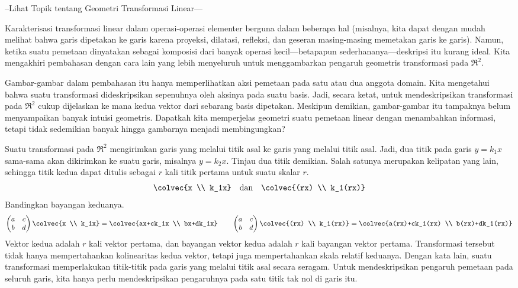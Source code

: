--Lihat Topik tentang Geometri Transformasi Linear---

Karakterisasi transformasi linear dalam operasi-operasi elementer berguna dalam
beberapa hal (misalnya, kita dapat dengan mudah melihat bahwa garis dipetakan ke
garis karena proyeksi, dilatasi, refleksi, dan geseran masing-masing memetakan
garis ke garis). Namun, ketika suatu pemetaan dinyatakan sebagai komposisi dari
banyak operasi kecil---betapapun sederhananya---deskripsi itu kurang ideal.
Kita mengakhiri pembahasan dengan cara lain yang lebih menyeluruh untuk
menggambarkan pengaruh geometris transformasi pada $\Re^2$.

Gambar-gambar dalam pembahasan itu hanya memperlihatkan aksi pemetaan pada satu
atau dua anggota domain. Kita mengetahui bahwa suatu transformasi dideskripsikan
sepenuhnya oleh aksinya pada suatu basis. Jadi, secara ketat, untuk
mendeskripsikan transformasi pada $\Re^2$ cukup dijelaskan ke mana kedua vektor
dari sebarang basis dipetakan. Meskipun demikian, gambar-gambar itu tampaknya
belum menyampaikan banyak intuisi geometris. Dapatkah kita memperjelas geometri
suatu pemetaan linear dengan menambahkan informasi, tetapi tidak sedemikian
banyak hingga gambarnya menjadi membingungkan?

Suatu transformasi pada $\Re^2$ mengirimkan garis yang melalui titik asal ke
garis yang melalui titik asal. Jadi, dua titik pada garis $y=k_1x$ sama-sama
akan dikirimkan ke suatu garis, misalnya $y=k_2x$. Tinjau dua titik demikian.
Salah satunya merupakan kelipatan yang lain, sehingga titik kedua dapat ditulis
sebagai $r$ kali titik pertama untuk suatu skalar $r$.
\begin{equation*}
  \colvec{x \\ k_1x}\quad\mbox{dan}\quad\colvec{(rx) \\ k_1(rx)}
\end{equation*}
Bandingkan bayangan keduanya.
\begin{equation*}
  \begin{pmatrix}
    a  &c  \\
    b  &d
  \end{pmatrix}
  \colvec{x \\ k_1x}
  =
  \colvec{ax+ck_1x \\ bx+dk_1x}
  \qquad
  \begin{pmatrix}
    a  &c  \\
    b  &d
  \end{pmatrix}
  \colvec{(rx) \\ k_1(rx)}
  =
  \colvec{a(rx)+ck_1(rx) \\ b(rx)+dk_1(rx)}
\end{equation*}
Vektor kedua adalah $r$ kali vektor pertama, dan bayangan vektor kedua adalah
$r$ kali bayangan vektor pertama. Transformasi tersebut tidak hanya
mempertahankan kolinearitas kedua vektor, tetapi juga mempertahankan skala
relatif keduanya. Dengan kata lain, suatu transformasi memperlakukan titik-titik
pada garis yang melalui titik asal secara seragam. Untuk mendeskripsikan pengaruh
pemetaan pada seluruh garis, kita hanya perlu mendeskripsikan pengaruhnya pada
satu titik tak nol di garis itu.

